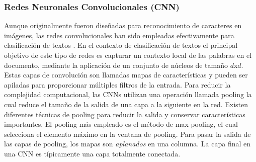 \subsubsection{Redes Neuronales Convolucionales (CNN)}
Aunque originalmente fueron diseñadas para reconocimiento de caracteres en imágenes, las redes convolucionales han sido empleadas efectivamente para clasificación de textos \citep{kim2014convolutional, zhang2015character, zhang2015sensitivity, conneau2016very}.
En el contexto de clasificación de textos el principal objetivo de este tipo de redes es capturar un contexto local de las palabras en el documento, mediante la aplicación de un conjunto de núcleos de tamaño $d$x$d$. Estas capas de convolución son llamadas mapas de características y pueden ser apiladas para proporcionar múltiples filtros de la entrada. Para reducir la complejidad computacional, las CNNs utilizan una operación llamada pooling la cual reduce el tamaño de la salida de una capa a la siguiente en la red. Existen diferentes técnicas de pooling para reducir la salida y conservar características importantes. El pooling más empleado es el método de max pooling, el cual selecciona el elemento máximo en la ventana de pooling. Para pasar la salida de las capas de pooling, los mapas son \textit{aplanados} en una columna. La capa final en una CNN es típicamente una capa totalmente conectada.


